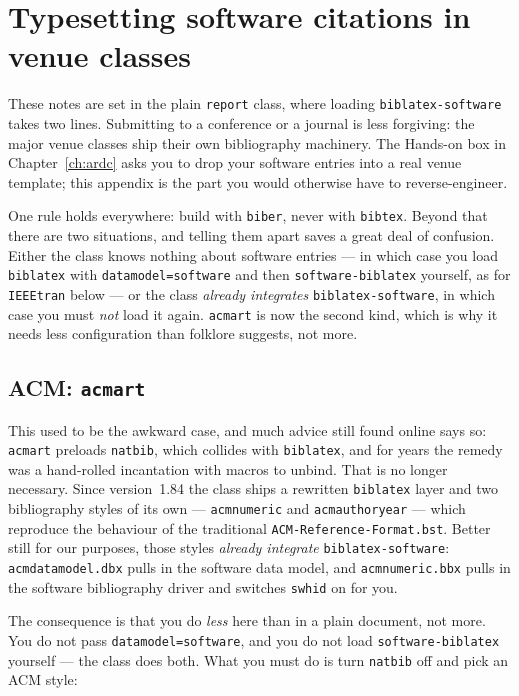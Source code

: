 \chapter{Typesetting software citations in venue classes}
\label{app:venue-classes}

These notes are set in the plain \texttt{report} class, where loading
\texttt{biblatex-software} takes two lines. Submitting to a conference or a journal is less
forgiving: the major venue classes ship their own bibliography machinery. The Hands-on box in
Chapter~\ref{ch:ardc} asks you to drop your software entries into a real venue template; this
appendix is the part you would otherwise have to reverse-engineer.

One rule holds everywhere: build with \texttt{biber}, never with \texttt{bibtex}. Beyond that there
are two situations, and telling them apart saves a great deal of confusion. Either the class knows
nothing about software entries --- in which case you load \texttt{biblatex} with
\texttt{datamodel=software} and then \texttt{software-biblatex} yourself, as for \texttt{IEEEtran}
below --- or the class \emph{already integrates} \texttt{biblatex-software}, in which case you must
\emph{not} load it again. \texttt{acmart} is now the second kind, which is why it needs less
configuration than folklore suggests, not more.

\section{ACM: \texttt{acmart}}

This used to be the awkward case, and much advice still found online says so: \texttt{acmart}
preloads \texttt{natbib}, which collides with \texttt{biblatex}, and for years the remedy was a
hand-rolled incantation with macros to unbind. That is no longer necessary. Since version~1.84 the
class ships a rewritten \texttt{biblatex} layer and two bibliography styles of its own ---
\texttt{acmnumeric} and \texttt{acmauthoryear} --- which reproduce the behaviour of the traditional
\texttt{ACM-Reference-Format.bst}. Better still for our purposes, those styles \emph{already
integrate} \texttt{biblatex-software}: \texttt{acmdatamodel.dbx} pulls in the software data model,
and \texttt{acmnumeric.bbx} pulls in the software bibliography driver and switches \texttt{swhid} on
for you.

The consequence is that you do \emph{less} here than in a plain document, not more. You do not pass
\texttt{datamodel=software}, and you do not load \texttt{software-biblatex} yourself --- the class
does both. What you must do is turn \texttt{natbib} off and pick an ACM style:


